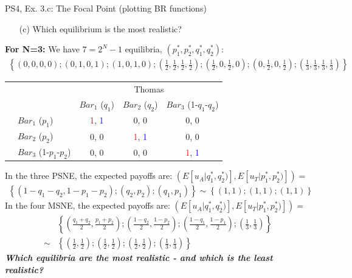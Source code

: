 \begin{frame}{PS4, Ex. 3.c: The Focal Point (plotting BR functions)}
    \begin{itemize}
      \item[(c)] Which equilibrium is the most realistic?
    \end{itemize}
    \textbf{For N=3:} We have $7=2^N-1$ equilibria, $(p_1^{*},p_2^{*},q_1^{*},q_2^{*})$:
    \begin{align*}
      \left\{(0,0,0,0);(0,1,0,1);(1,0,1,0)
      ;\left(\frac{1}{2},\frac{1}{2},\frac{1}{2},\frac{1}{2}\right)
      ;\left(\frac{1}{2},0,\frac{1}{2},0\right)
      ;\left(0,\frac{1}{2},0,\frac{1}{2}\right)
      ;\left(\frac{1}{3},\frac{1}{3},\frac{1}{3},\frac{1}{3}\right)
      \right\}
    \end{align*}
    \vspace{-12pt}
    \begin{table}
      \begin{tabular}{cl|c|c|c|}
        & \multicolumn{1}{c}{} & \multicolumn{3}{c}{\color{blue}Thomas}\\
        & \multicolumn{1}{c}{} & \multicolumn{1}{c}{$Bar_1$ ($q_1$)} & \multicolumn{1}{c}{$Bar_2$ ($q_2$)} & \multicolumn{1}{c}{$Bar_3$ (1-$q_1$-$q_2$)} \\\cline{3-5}
        \parbox[t]{1mm}{}
        & $Bar_1$ ($p_1$) & \textcolor{red}{1}, \textcolor{blue}{1} & 0, 0 & 0, 0 \\
        & $Bar_2$ ($p_2$) & 0, 0 & \textcolor{red}{1}, \textcolor{blue}{1} & 0, 0 \\
        & $Bar_3$ (1-$p_1$-$p_2$) & 0, 0 & 0, 0 & \textcolor{red}{1}, \textcolor{blue}{1} \\
      \end{tabular}
    \end{table}
    In the three PSNE, the expected payoffs are: $\left(E[u_A|q_1^{*},q_2^{*})],E[u_T|p_1^{*},p_2^{*})]\right)=$
    \begin{align*}
      \left\{(1-q_1-q_2,1-p_1-p_2);(q_2,p_2);(q_1,p_1)\right\}\sim
      \left\{(1,1);(1,1);(1,1)\right\}
    \end{align*}
    In the four MSNE, the expected payoffs are: $\left(E[u_A|q_1^{*},q_2^{*})],E[u_T|p_1^{*},p_2^{*})]\right)=$
    \begin{align*}
     &\left\{\left(\frac{q_1+q_2}{2},\frac{p_1+p_2}{2}\right)
      ;\left(\frac{1-q_2}{2},\frac{1-p_2}{2}\right)
      ;\left(\frac{1-q_1}{2},\frac{1-p_1}{2}\right)
      ;\left(\frac{1}{3},\frac{1}{3}\right)\right\} \\
     \sim
     &\left\{\left(\frac{1}{2},\frac{1}{2}\right)
      ;\left(\frac{1}{2},\frac{1}{2}\right)
      ;\left(\frac{1}{2},\frac{1}{2}\right)
      ;\left(\frac{1}{3},\frac{1}{3}\right)\right\}
    \end{align*}
    \textbf{\textit{Which equilibria are the most realistic - and which is the least realistic?}}
\end{frame}
